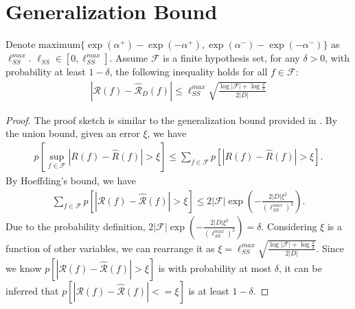 \appendix

\setcounter{figure}{0}
\renewcommand{\thefigure}{A\arabic{figure}}
\setcounter{table}{0}
\renewcommand{\thetable}{A\arabic{table}}


\section{Generalization Bound}
\label{sec:gb}
\begin{theorem*}%
	Denote $\text{maximum}\{\exp(\alpha^{+})-\exp(-\alpha^{+}), \exp(\alpha^{-})-\exp(-\alpha^{-})\}$ as $\ell_{SS}^{max}$. $\ell_{SS}\in [0, \ell_{SS}^{max}]$. Assume $\mathcal{F}$ is a finite hypothesis set, for any $\delta>0$, with probability at least $1-\delta$, the following inequality holds for all $f\in \mathcal{F}$:
	\begin{align*}
	|\mathcal{R}(f) - \hat{\mathcal{R}}_{D}(f) | \le  \ell^{max}_{SS}\sqrt{\frac{\log|\mathcal{F}|+\log\frac{2}{\delta}}{2|D|}}
	\end{align*}
\end{theorem*}
\begin{proof}[Proof]
	The proof sketch is similar to the generalization bound provided in \cite{Mohri_MIT_2018}.
	By the union bound, given an error $\xi$, we have
	\begin{align*}
	p[\sup_{f\in \mathcal{F}}|R(f)-\hat{R}(f)| > \xi] \le \sum_{f\in \mathcal{F}}^{} p[|R(f)-\hat{R}(f)|> \xi].
	\end{align*}
	By Hoeffding's bound, we have
	\begin{align*}
	\sum_{f\in \mathcal{F}}^{} p[|\mathcal{R}(f)-\hat{\mathcal{R}}(f)|> \xi] \le 2|\mathcal{F}|\exp \left(-\frac{2|D|\xi^2}{(\ell_{SS}^{max})^{2}} \right).
	\end{align*}
	Due to the probability definition, $2|\mathcal{F}|\exp (-\frac{2|D|\xi^2}{(\ell_{SS}^{max})^{2}}) = \delta$. Considering $\xi$ is a function of other variables, we can rearrange it as 
	$\xi=\ell_{SS}^{max}\sqrt{\frac{\log|\mathcal{F}|+\log\frac{2}{\delta}}{2|D|}}$.
	Since we know $p[|\mathcal{R}(f)-\hat{\mathcal{R}}(f)| > \xi]$ is with probability at most $\delta$, it can be inferred that $p[|\mathcal{R}(f)-\hat{\mathcal{R}}(f)| <= \xi]$ is at least $1-\delta$.
\end{proof}

